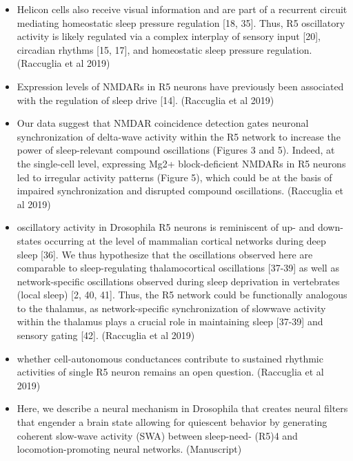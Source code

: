 \documentclass[11pt]{article}
\begin{document}
\begin{itemize}
    \item Helicon cells also receive visual information and are part of a recurrent circuit mediating homeostatic sleep pressure regulation [18, 35]. Thus, R5 oscillatory activity is likely regulated via a complex interplay of sensory input [20], circadian rhythms [15, 17], and homeostatic sleep pressure regulation.
    \parencite{raccugliaNetworkSpecificSynchronizationElectrical2019} (Raccuglia et al 2019)

    \item Expression levels of NMDARs in R5 neurons have previously been associated with the regulation of sleep drive [14].
    \parencite{raccugliaNetworkSpecificSynchronizationElectrical2019} (Raccuglia et al 2019)

    \item Our data suggest that NMDAR coincidence detection gates neuronal synchronization of delta-wave activity within the R5 network to increase the power of sleep-relevant compound oscillations (Figures 3 and 5). Indeed, at the single-cell level, expressing Mg2+ block-deficient NMDARs in R5 neurons led to irregular activity patterns (Figure 5), which could be at the basis of impaired synchronization and disrupted compound oscillations.
    \parencite{raccugliaNetworkSpecificSynchronizationElectrical2019} (Raccuglia et al 2019)

    \item oscillatory activity in Drosophila R5 neurons is reminiscent of up- and down-states occurring at the level of mammalian cortical networks during deep sleep [36].
    We thus hypothesize that the oscillations observed here are comparable to sleep-regulating thalamocortical oscillations [37-39] as well as network-specific oscillations observed during sleep deprivation in vertebrates (local sleep) [2, 40, 41]. Thus, the R5 network could be functionally analogous to the thalamus, as network-specific synchronization of slowwave activity within the thalamus plays a crucial role in maintaining sleep [37-39] and sensory gating [42].
    \parencite{raccugliaNetworkSpecificSynchronizationElectrical2019} (Raccuglia et al 2019)

    \item whether cell-autonomous conductances contribute to sustained rhythmic activities of single R5 neuron remains an open question.
    \parencite{raccugliaNetworkSpecificSynchronizationElectrical2019} (Raccuglia et al 2019)

    \item Here, we describe a neural mechanism in Drosophila that creates neural filters
    that engender a brain state allowing for quiescent behavior by generating coherent slow-wave
    activity (SWA) between sleep-need- (R5)4 and locomotion-promoting neural networks.
    \parencite{raccugliaCoherentMultilevelNetwork2022} (Manuscript)


\end{itemize}
\end{document}
